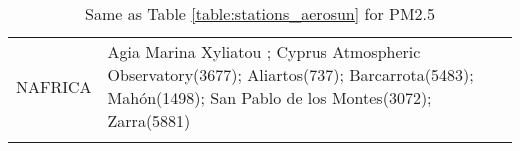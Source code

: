 \documentclass[journal abbreviation, manuscript]{copernicus}
\begin{document}
\begin{table}
\begin{tabularx}{\textwidth}{lX}
  NAFRICA &                                                                                                                                                                                                                                                                                                                                                                                                                                                                                                                                                                                                                                                                                                                                                                                                                                                                                                                                                                                                                                                                                                                                                                                                                                                                                                                                                                                                                                                                                                                                                                                                                                                                                                                                                                                                                                                                                                                                                                                                                                                                                                                                                                                                                                                                                                                                                                                                                                                                                                                                                                                                                                                                                                                                                                                               Agia Marina Xyliatou ; Cyprus Atmospheric Observatory(3677); Aliartos(737); Barcarrota(5483); Mahón(1498); San Pablo de los Montes(3072); Zarra(5881) \\
\bottomhline
 \end{tabularx}
 \caption{Same as Table \ref{table:stations_aerosun} for PM2.5}
 \label{table:stations_pm25}
\end{table}
\end{document}
